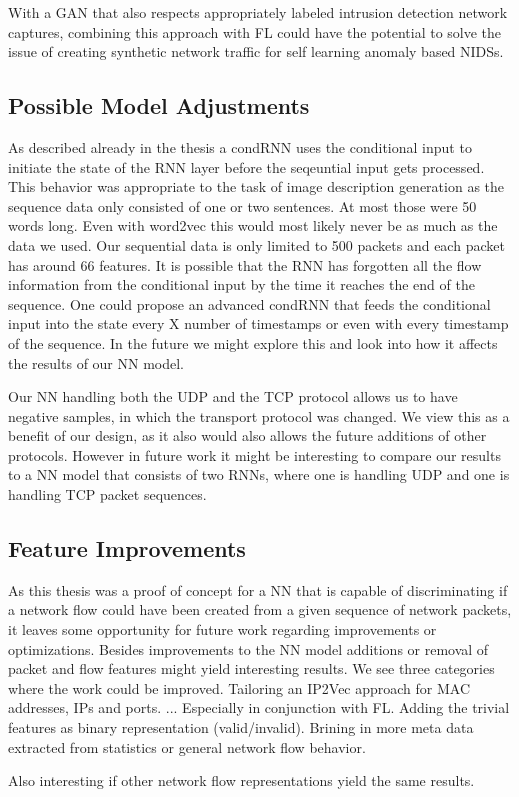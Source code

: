 \documentclass[
	ngerman,
	ruledheaders=section,%
	class=report,%
	thesis={type=bachelor},%
	accentcolor=9c,%
	custommargins=true,%
	marginpar=false,%
	parskip=half-,%
	fontsize=11pt,%
	twoside
]{tudapub}
\begin{document}
With a GAN that also respects appropriately labeled intrusion detection network captures,
combining this approach with FL could have the potential to solve the issue of creating synthetic network traffic for self learning anomaly based NIDSs.

\subsection{Possible Model Adjustments}
\label{sec:modelAdj}

As described already in the thesis a condRNN uses the conditional input to initiate the state of the RNN layer before the seqeuntial input gets processed.
This behavior was appropriate to the task of image description generation \cite{vinyalsShowTellNeural2015} \cite{karpathyDeepVisualSemanticAlignments2015} as the sequence data only consisted of one or two sentences.
At most those were 50 words long.
Even with word2vec this would most likely never be as much as the data we used.
Our sequential data is only limited to 500 packets and each packet has around 66 features.
It is possible that the RNN has forgotten all the flow information from the conditional input by the time it reaches the end of the sequence.
One could propose an advanced condRNN that feeds the conditional input into the state every X number of timestamps or even with every timestamp of the sequence.
In the future we might explore this and look into how it affects the results of our NN model.

Our NN handling both the UDP and the TCP protocol allows us to have negative samples, in which the transport protocol was changed.
We view this as a benefit of our design, as it also would also allows the future additions of other protocols.
However in future work it might be interesting to compare our results to a NN model that consists of two RNNs, where one is handling UDP and one is handling TCP packet sequences.

\subsection{Feature Improvements}
\label{sec:featureImprovements}

As this thesis was a proof of concept for a NN that is capable of discriminating if a network flow could have been created from a given sequence of network packets, it leaves some opportunity for future work regarding improvements or optimizations.
Besides improvements to the NN model additions or removal of packet and flow features might yield interesting results.
We see three categories where the work could be improved.
Tailoring an IP2Vec approach for MAC addresses, IPs and ports. ...
Especially in conjunction with FL.
Adding the trivial features as binary representation (valid/invalid).
Brining in more meta data extracted from statistics or general network flow behavior.

Also interesting if other network flow representations yield the same results.


\printbibliography
\end{document}
